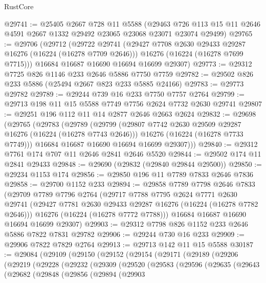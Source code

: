 \begin{lexlean}{RustCore}
\begin{coremodule}
@29741 := @25405
    @2667
    @728
    @11
    @5588
    (@29463 @726 @113 @15 @11 @2646 @4591 @2667 @1332 @29492 @23065 @23068 @23071 @23074 @29499)
@29765 := @29706
    (@29712
      (@29722
        @29741
        (@29427 @7708 @2630 @29433 @29287 @16276 (@16224 (@16278 @7709 @2646)))
        @16276
        (@16224 (@16278 @7699 @7715)))
      @16684
      @16687
      @16690
      @16694
      @16699
      @29307)
@29773 := @29312 @7725 @826 @1146 @233 @2646 @5886 @7750 @7759
@29782 := @29502 @826 @233 @5886 (@25494 @2667 @823 @233 @5885 @24166)
@29783 := @29773 @29782
@29789 := @29244 @739 @16 @233 @7750 @7757 @2764
@29799 := @29713 @198 @11 @15 @5588 @7749 @7756 @2624 @7732 @2630 @29741
@29807 := @29251 @196 @112 @11 @14 @2877 @2646 @2663 @2624
@29832 := @29698
    (@29765
      (@29783
        (@29789
          (@29799
            (@29807 @7742 @2630 @29509 @29287 @16276 (@16224 (@16278 @7743 @2646)))
            @16276
            (@16224 (@16278 @7733 @7749)))
          @16684
          @16687
          @16690
          @16694
          @16699
          @29307)))
@29840 := @29312 @7761 @174 @707 @11 @2646 @2841 @2646 @5520
@29844 := @29502 @174 @11 @2841 @29433
@29848 := @29690 (@29832 (@29840 @29844 @29500))
@29850 := @29234 @1153 @174
@29856 := @29850 @196 @11 @7789 @7833 @2646 @7836
@29858 := @29700 @1152 @233
@29894 := @29858
    @7789
    @7798
    @2646
    @7833
    (@29709
      @7789
      @7796
      @2764
      (@29717
        @7788
        @7795
        @2624
        @7771
        @2630
        @29741
        (@29427 @7781 @2630 @29433 @29287 @16276 (@16224 (@16278 @7782 @2646)))
        @16276
        (@16224 (@16278 @7772 @7788)))
      @16684
      @16687
      @16690
      @16694
      @16699
      @29307)
@29903 := @29312 @7798 @826 @1152 @233 @2646 @5886 @7822 @7831 @29782
@29906 := @29244 @730 @16 @233
@29909 := @29906 @7822 @7829 @2764
@29913 := @29713 @142 @11 @15 @5588
@30187 := @29084
    (@29109
      (@29150
        (@29152
          (@29154
            (@29171
              (@29189
                (@29206
                  (@29219
                    (@29228
                      (@29232
                        (@29309
                          (@29520
                            (@29583
                              (@29596
                                (@29635
                                  (@29643
                                    (@29682
                                      (@29848
                                        (@29856
                                          (@29894
                                            (@29903

\end{coremodule}
\end{lexlean}
